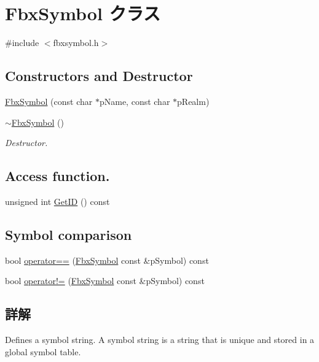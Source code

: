 \hypertarget{class_fbx_symbol}{}\section{Fbx\+Symbol クラス}
\label{class_fbx_symbol}


{\ttfamily \#include $<$fbxsymbol.\+h$>$}

\subsection*{Constructors and Destructor}
\begin{DoxyCompactItemize}
\item 
\hyperlink{class_fbx_symbol_ac9c03734e434a83ec3ef918864cd3e85}{Fbx\+Symbol} (const char $\ast$p\+Name, const char $\ast$p\+Realm)
\item 
\hyperlink{class_fbx_symbol_a50d2302a5d037c49c5f0744a87acdf5f}{$\sim$\+Fbx\+Symbol} ()
\begin{DoxyCompactList}\small\item\em Destructor. \end{DoxyCompactList}\end{DoxyCompactItemize}
\subsection*{Access function.}
\begin{DoxyCompactItemize}
\item 
unsigned int \hyperlink{class_fbx_symbol_ad09b7aceadb22213dad8208edaf9cce4}{Get\+ID} () const
\end{DoxyCompactItemize}
\subsection*{Symbol comparison}
\begin{DoxyCompactItemize}
\item 
bool \hyperlink{class_fbx_symbol_a12639dda60610e915b51c4c71e572380}{operator==} (\hyperlink{class_fbx_symbol}{Fbx\+Symbol} const \&p\+Symbol) const
\item 
bool \hyperlink{class_fbx_symbol_a8ff86aa00a433b63b02d4a5f1cd502b8}{operator!=} (\hyperlink{class_fbx_symbol}{Fbx\+Symbol} const \&p\+Symbol) const
\end{DoxyCompactItemize}


\subsection{詳解}
Defines a symbol string. A symbol string is a string that is unique and stored in a global symbol table. 

